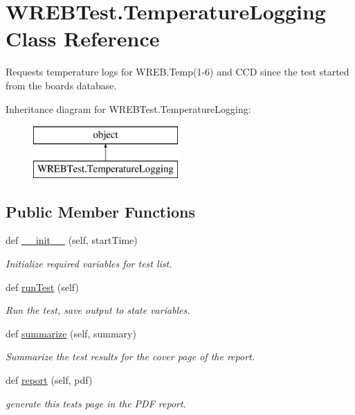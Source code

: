 \hypertarget{class_w_r_e_b_test_1_1_temperature_logging}{}\section{W\+R\+E\+B\+Test.\+Temperature\+Logging Class Reference}
\label{class_w_r_e_b_test_1_1_temperature_logging}


Requests temperature logs for W\+R\+E\+B.\+Temp(1-\/6) and C\+CD since the test started from the board\textquotesingle{}s database.  


Inheritance diagram for W\+R\+E\+B\+Test.\+Temperature\+Logging\+:\begin{figure}[H]
\begin{center}
\leavevmode
\includegraphics[height=2.000000cm]{class_w_r_e_b_test_1_1_temperature_logging}
\end{center}
\end{figure}
\subsection*{Public Member Functions}
\begin{DoxyCompactItemize}
\item 
def \hyperlink{class_w_r_e_b_test_1_1_temperature_logging_a58d5dab39c261476eec7ea47a5e90d9e}{\+\_\+\+\_\+init\+\_\+\+\_\+} (self, start\+Time)
\begin{DoxyCompactList}\small\item\em Initialize required variables for test list. \end{DoxyCompactList}\item 
def \hyperlink{class_w_r_e_b_test_1_1_temperature_logging_ade8e340fe3b9506a4579925fcc8815de}{run\+Test} (self)
\begin{DoxyCompactList}\small\item\em Run the test, save output to state variables. \end{DoxyCompactList}\item 
def \hyperlink{class_w_r_e_b_test_1_1_temperature_logging_a7fdba53169a60c8ae4da20f253c911a1}{summarize} (self, summary)
\begin{DoxyCompactList}\small\item\em Summarize the test results for the cover page of the report. \end{DoxyCompactList}\item 
def \hyperlink{class_w_r_e_b_test_1_1_temperature_logging_a1b7cc6f99d91150acccc382ccd8416c8}{report} (self, pdf)
\begin{DoxyCompactList}\small\item\em generate this test\textquotesingle{}s page in the P\+DF report. \end{DoxyCompactList}\end{DoxyCompactItemize}


